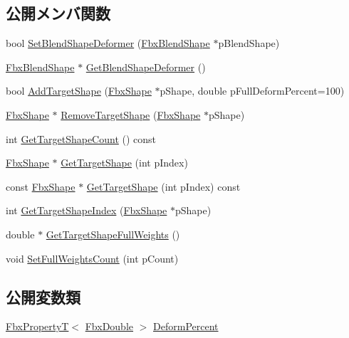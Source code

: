 \subsection*{公開メンバ関数}
\begin{DoxyCompactItemize}
\item 
bool \hyperlink{class_fbx_blend_shape_channel_afa4cd576c24385c4ee10279a1deabc4d}{Set\+Blend\+Shape\+Deformer} (\hyperlink{class_fbx_blend_shape}{Fbx\+Blend\+Shape} $\ast$p\+Blend\+Shape)
\item 
\hyperlink{class_fbx_blend_shape}{Fbx\+Blend\+Shape} $\ast$ \hyperlink{class_fbx_blend_shape_channel_aa79b43cdb62a8dc5bbafad03acbf4425}{Get\+Blend\+Shape\+Deformer} ()
\item 
bool \hyperlink{class_fbx_blend_shape_channel_aa09d012a7304dd2098ebd2a066d53dde}{Add\+Target\+Shape} (\hyperlink{class_fbx_shape}{Fbx\+Shape} $\ast$p\+Shape, double p\+Full\+Deform\+Percent=100)
\item 
\hyperlink{class_fbx_shape}{Fbx\+Shape} $\ast$ \hyperlink{class_fbx_blend_shape_channel_a13265acf6f671cf6ec1228105831ff15}{Remove\+Target\+Shape} (\hyperlink{class_fbx_shape}{Fbx\+Shape} $\ast$p\+Shape)
\item 
int \hyperlink{class_fbx_blend_shape_channel_a61e052b389537fcb7db318853c17160c}{Get\+Target\+Shape\+Count} () const
\item 
\hyperlink{class_fbx_shape}{Fbx\+Shape} $\ast$ \hyperlink{class_fbx_blend_shape_channel_a50cdc8d0c76e13c093453efca50484a6}{Get\+Target\+Shape} (int p\+Index)
\item 
const \hyperlink{class_fbx_shape}{Fbx\+Shape} $\ast$ \hyperlink{class_fbx_blend_shape_channel_ae91fea86db9ce91da637df78762b4fff}{Get\+Target\+Shape} (int p\+Index) const
\item 
int \hyperlink{class_fbx_blend_shape_channel_a75e572afbee5b3c5c635932282b86473}{Get\+Target\+Shape\+Index} (\hyperlink{class_fbx_shape}{Fbx\+Shape} $\ast$p\+Shape)
\item 
double $\ast$ \hyperlink{class_fbx_blend_shape_channel_af3d0ae44fb85c9bdc485a7c607190cfd}{Get\+Target\+Shape\+Full\+Weights} ()
\item 
void \hyperlink{class_fbx_blend_shape_channel_a2e06faf81dd8983124645590f673d119}{Set\+Full\+Weights\+Count} (int p\+Count)
\end{DoxyCompactItemize}
\subsection*{公開変数類}
\begin{DoxyCompactItemize}
\item 
\hyperlink{class_fbx_property_t}{Fbx\+PropertyT}$<$ \hyperlink{fbxtypes_8h_a171e72a1c46fc15c1a6c9c31948c1c5b}{Fbx\+Double} $>$ \hyperlink{class_fbx_blend_shape_channel_a7b6c288c4f2d70fed6f29b424d7020a4}{Deform\+Percent}
\end{DoxyCompactItemize}
